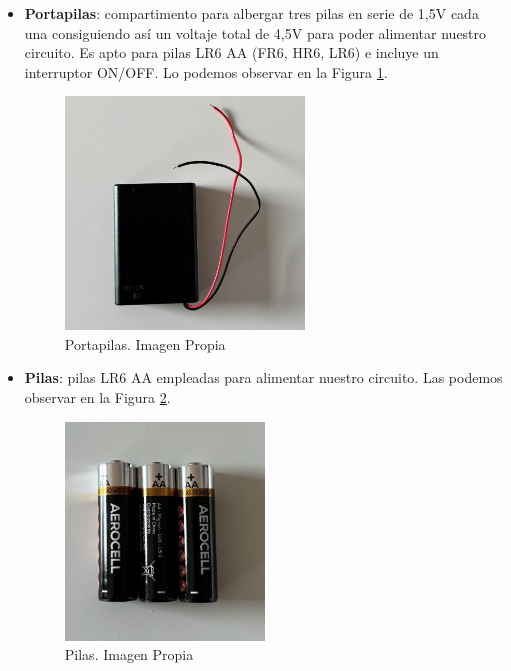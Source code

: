 \begin{itemize}
    \item \textbf{Portapilas}: compartimento para albergar tres pilas en serie de 1,5V cada una consiguiendo así un voltaje total de 4,5V para poder alimentar nuestro circuito. Es apto para pilas LR6 AA (FR6, HR6, LR6) e incluye un interruptor ON/OFF. Lo podemos observar en la Figura \ref{fig:portapilas}.
    \begin{figure}[h]
    \centering
    \includegraphics[width=0.6\textwidth]{img/portapilas.jpg}
    \caption{Portapilas. Imagen Propia}
    \label{fig:portapilas}
\end{figure}

    \item \textbf{Pilas}: pilas LR6 AA empleadas para alimentar nuestro circuito. Las podemos observar en la Figura \ref{fig: pilas}.
    \begin{figure}[h]
    \centering
    \includegraphics[width=0.5\textwidth]{img/pilas.jpg}
    \caption{Pilas. Imagen Propia}
    \label{fig: pilas}
\end{figure}

\end{itemize}
